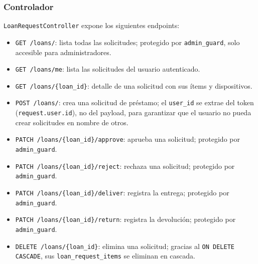 \subsubsection*{Controlador}

\texttt{LoanRequestController} expone los siguientes endpoints:

\begin{itemize}
	\item \texttt{GET /loans/}: lista todas las solicitudes; protegido por \texttt{admin\_guard}, solo accesible para administradores.
	\item \texttt{GET /loans/me}: lista las solicitudes del usuario autenticado.
	\item \texttt{GET /loans/\{loan\_id\}}: detalle de una solicitud con sus ítems y dispositivos.
	\item \texttt{POST /loans/}: crea una solicitud de préstamo; el \texttt{user\_id} se extrae del token (\texttt{request.user.id}), no del payload, para garantizar que el usuario no pueda crear solicitudes en nombre de otros.
	\item \texttt{PATCH /loans/\{loan\_id\}/approve}: aprueba una solicitud; protegido por \texttt{admin\_guard}.
	\item \texttt{PATCH /loans/\{loan\_id\}/reject}: rechaza una solicitud; protegido por \texttt{admin\_guard}.
	\item \texttt{PATCH /loans/\{loan\_id\}/deliver}: registra la entrega; protegido por \texttt{admin\_guard}.
	\item \texttt{PATCH /loans/\{loan\_id\}/return}: registra la devolución; protegido por \texttt{admin\_guard}.
	\item \texttt{DELETE /loans/\{loan\_id\}}: elimina una solicitud; gracias al \texttt{ON DELETE CASCADE}, sus \texttt{loan\_request\_items} se eliminan en cascada.
\end{itemize}
